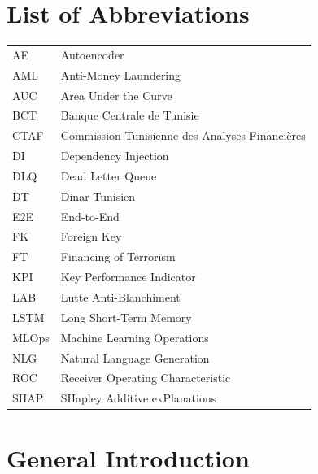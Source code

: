 \documentclass[a4paper,12pt]{report}
\begin{document}
\listoftables
{}
\newpage

\chapter*{List of Abbreviations}

\begin{tabular}{@{}ll@{}}
    AE       & Autoencoder \\
    AML      & Anti-Money Laundering \\
    AUC      & Area Under the Curve \\
    BCT      & Banque Centrale de Tunisie \\
    CTAF     & Commission Tunisienne des Analyses Financières \\
    DI       & Dependency Injection \\
    DLQ      & Dead Letter Queue \\
    DT       & Dinar Tunisien \\
    E2E      & End-to-End \\
    FK       & Foreign Key \\
    FT       & Financing of Terrorism \\
    KPI      & Key Performance Indicator \\
    LAB      & Lutte Anti-Blanchiment \\
    LSTM     & Long Short-Term Memory \\
    MLOps    & Machine Learning Operations \\
    NLG      & Natural Language Generation \\
    ROC      & Receiver Operating Characteristic \\
    SHAP     & SHapley Additive exPlanations \\
\end{tabular}

\newpage


\chapter*{General Introduction}

\end{document}
